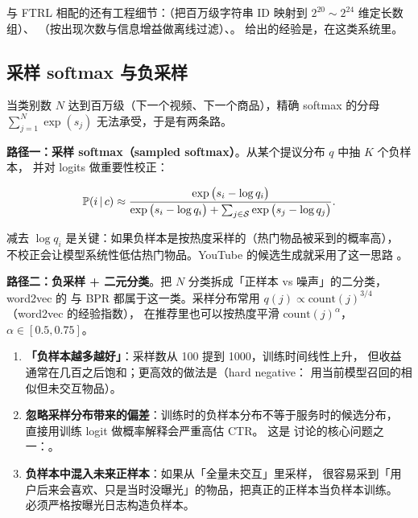 与 FTRL 相配的还有工程细节：（把百万级字符串 ID 映射到 $2^{20} \sim 2^{24}$ 维定长数组）、
（按出现次数与信息增益做离线过滤）、。
\cite{he2014practical} 给出的经验是，在这类系统里。

\subsection{采样 softmax 与负采样}

当类别数 $N$ 达到百万级（下一个视频、下一个商品），精确 softmax 的分母
$\sum_{j=1}^{N}\exp(s_j)$ 无法承受，于是有两条路。

\textbf{路径一：采样 softmax（sampled softmax）}。从某个提议分布 $q$ 中抽 $K$ 个负样本，
并对 logits 做重要性校正：

\begin{equation}
\operatorname{\mathbb{P}}(i \,\vert\, c) \approx
\frac{\exp\big(s_i - \log q_i\big)}
{\exp\big(s_i - \log q_i\big) + \sum_{j \in \mathcal{S}} \exp\big(s_j - \log q_j\big)} .
\label{eq:sampled-softmax}
\end{equation}

减去 $\log q_i$ 是关键：如果负样本是按热度采样的（热门物品被采到的概率高），
不校正会让模型系统性低估热门物品。YouTube 的候选生成就采用了这一思路 \cite{covington2016youtube}。

\textbf{路径二：负采样 + 二元分类}。把 $N$ 分类拆成「正样本 vs 噪声」的二分类，
word2vec 的  \cite{mikolov2013word2vec} 与
BPR \cite{rendle2009bpr} 都属于这一类。采样分布常用
$q(j) \propto \text{count}(j)^{3/4}$（word2vec 的经验指数），
在推荐里也可以按热度平滑 $\text{count}(j)^{\alpha}$，$\alpha \in [0.5, 0.75]$。

\begin{pitfall}[负采样比例的三个误区]
\begin{enumerate}
  \item \textbf{「负样本越多越好」}：采样数从 100 提到 1000，训练时间线性上升，
        但收益通常在几百之后饱和；更高效的做法是（hard negative：
        用当前模型召回的相似但未交互物品）。
  \item \textbf{忽略采样分布带来的偏差}：训练时的负样本分布不等于服务时的候选分布，
        直接用训练 logit 做概率解释会严重高估 CTR。
        这是 \cite{chapelle2014simple} 讨论的核心问题之一：。
  \item \textbf{负样本中混入未来正样本}：如果从「全量未交互」里采样，
        很容易采到「用户后来会喜欢、只是当时没曝光」的物品，把真正的正样本当负样本训练。
        必须严格按曝光日志构造负样本。
\end{enumerate}
\end{pitfall}

